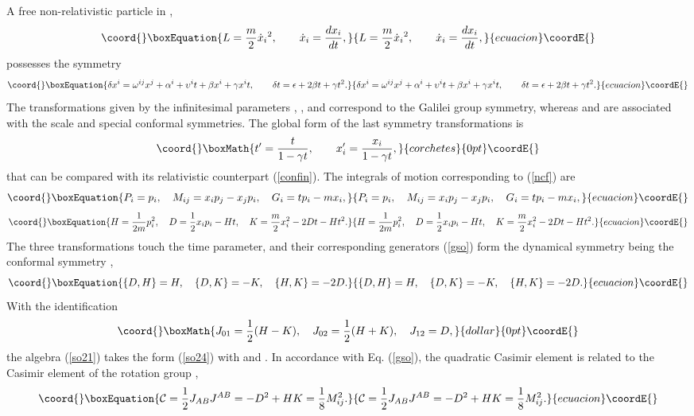 \documentclass[a4paper,12pt]{article}
\def\R{\mathbb R}
\begin{document}
A
free non-relativistic particle
in \myHighlight{$\R^d$}\coordHE{},
\begin{equation}\coord{}\boxEquation{
L=\frac{m}{2}\dot{x}_i{}^2,\qquad \dot{x}_i=\frac{dx_i}{dt},
\label{mnr}
}{
L=\frac{m}{2}\dot{x}_i{}^2,\qquad \dot{x}_i=\frac{dx_i}{dt},
}{ecuacion}\coordE{}\end{equation}
possesses the symmetry
\begin{equation}\coord{}\boxEquation{
\delta x^i= \omega^{ij}x^j+\alpha^i+
\upsilon^i t+\beta x^i+\gamma x^i t,\qquad
\delta t=\epsilon + 2\beta t +\gamma t^2.
\label{ncf}
}{
\delta x^i= \omega^{ij}x^j+\alpha^i+
\upsilon^i t+\beta x^i+\gamma x^i t,\qquad
\delta t=\epsilon + 2\beta t +\gamma t^2.
}{ecuacion}\coordE{}\end{equation}
The transformations given by
the infinitesimal parameters
\coordHE{},
\coordHE{},
\coordHE{} and
\myHighlight{$\epsilon$}\coordHE{}
correspond to the Galilei group symmetry,
whereas
\myHighlight{$\beta$}\coordHE{} and \myHighlight{$\gamma$}\coordHE{}
are associated with
the scale and special conformal
symmetries. The global form of the
last symmetry transformations is
\[\coord{}\boxMath{
t'=\frac{t}{1-\gamma t},
\qquad
x'_i=\frac{x_i}{1-\gamma t},
}{corchetes}{0pt}\coordE{}\]
that can be compared with its relativistic
counterpart (\ref{confin}).
The
integrals of motion
corresponding to (\ref{ncf})
are
\begin{equation}\coord{}\boxEquation{
P_i=p_i,\quad
M_{ij}=x_ip_j-x_jp_i,\quad
G_i=tp_i-mx_i,
\label{galilei}
}{
P_i=p_i,\quad
M_{ij}=x_ip_j-x_jp_i,\quad
G_i=tp_i-mx_i,
}{ecuacion}\coordE{}\end{equation}
\begin{equation}\coord{}\boxEquation{
H=\frac{1}{2m} p_i^2,\quad
D=\frac{1}{2}x_ip_i-Ht,\quad
K=\frac{m}{2}x_i^2 -2Dt -Ht^2.
\label{gso}
}{
H=\frac{1}{2m} p_i^2,\quad
D=\frac{1}{2}x_ip_i-Ht,\quad
K=\frac{m}{2}x_i^2 -2Dt -Ht^2.
}{ecuacion}\coordE{}\end{equation}
The three transformations touch the
time parameter, and their corresponding
generators
(\ref{gso})
form the dynamical symmetry
being the conformal symmetry \coordHE{},
\begin{equation}\coord{}\boxEquation{
\{D,H\}=H,\quad
\{D,K\}=-K,\quad
\{H,K\}=-2D.
\label{so21}
}{
\{D,H\}=H,\quad
\{D,K\}=-K,\quad
\{H,K\}=-2D.
}{ecuacion}\coordE{}\end{equation}
With the identification
$$\coord{}\boxMath{
J_{01}=\frac{1}{2}(H-K),\quad
J_{02}=\frac{1}{2}(H+K),\quad
J_{12}=D,
}{dollar}{0pt}\coordE{}$$
the algebra (\ref{so21}) takes the form (\ref{so24})
with \coordHE{}  and
\coordHE{}.
In accordance with Eq. (\ref{gso}),
the \coordHE{} quadratic Casimir element is
related to the Casimir element of the rotation
group \coordHE{},
\begin{equation}\coord{}\boxEquation{
{\cal C}=\frac{1}{2}J_{AB}J^{AB}=-D^2+HK=\frac{1}{8}
M_{ij}^2.
\label{casimir}
}{
{\cal C}=\frac{1}{2}J_{AB}J^{AB}=-D^2+HK=\frac{1}{8}
M_{ij}^2.
}{ecuacion}\coordE{}\end{equation}
\end{document}
